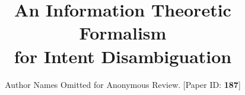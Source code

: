 \documentclass[conference]{IEEEtran}
\begin{document}
\title{An Information Theoretic Formalism \\for Intent Disambiguation}
\author{Author Names Omitted for Anonymous Review. [Paper ID: \textbf{187}]}




% 
%	
%	
%	
%	

\maketitle
\end{document}
